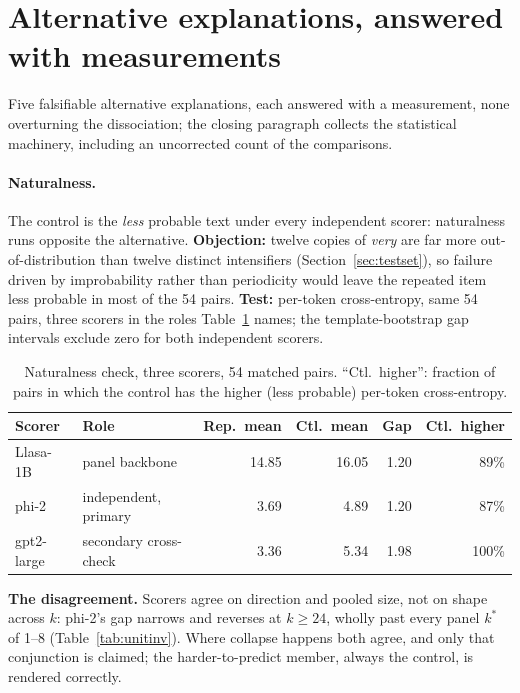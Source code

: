 \section{Alternative explanations, answered with measurements}
\label{sec:alternatives}

Five falsifiable alternative explanations, each answered with a measurement, none overturning
the dissociation; the closing paragraph collects the statistical machinery, including an
uncorrected count of the comparisons.

\paragraph{Naturalness.} The control is the \emph{less} probable text under every independent
scorer: naturalness runs opposite the alternative. \textbf{Objection:} twelve copies of
\emph{very} are far more out-of-distribution than twelve distinct intensifiers
(Section~\ref{sec:testset}), so failure driven by improbability rather than periodicity would
leave the repeated item less probable in most of the 54 pairs. \textbf{Test:} per-token
cross-entropy, same 54 pairs, three scorers in the roles Table~\ref{tab:naturalness} names; the
template-bootstrap gap intervals exclude zero for both independent scorers.

\begin{table}[tp]
\centering
\caption{Naturalness check, three scorers, 54 matched pairs. ``Ctl.\ higher'': fraction of pairs in
which the control has the higher (less probable) per-token cross-entropy.}
\label{tab:naturalness}
\small
\begin{tabular}{@{}lp{2.6cm}rrrr@{}}
\toprule
Scorer & Role & Rep.\ mean & Ctl.\ mean & Gap & Ctl.\ higher \\
\midrule
Llasa-1B & panel backbone & 14.85 & 16.05 & 1.20 & 89\% \\
phi-2 & independent, primary & 3.69 & 4.89 & 1.20 & 87\% \\
gpt2-large & secondary cross-check & 3.36 & 5.34 & 1.98 & 100\% \\
\bottomrule
\end{tabular}
\end{table}

\noindent\textbf{The disagreement.} Scorers agree on direction and pooled size, not on shape
across $k$: phi-2's gap narrows and reverses at $k\ge24$, wholly past every panel $k^\ast$ of
1--8 (Table~\ref{tab:unitinv}). Where collapse happens both agree, and only that conjunction is
claimed; the harder-to-predict member, always the control, is rendered correctly.


